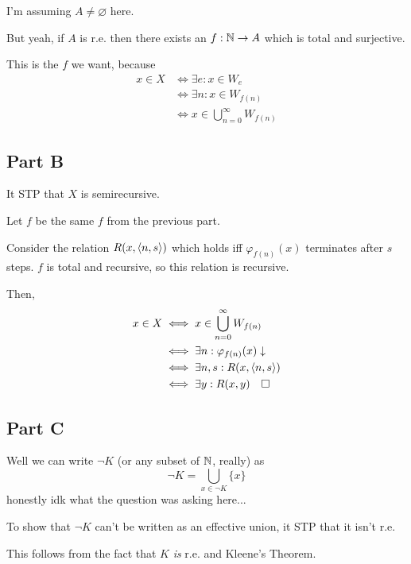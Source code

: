 \documentclass[12pt]{article}
\begin{document}
I'm assuming $A \ne \varnothing$ here.

But yeah, if $A$ is r.e. then there exists an $f: \mathbb{N} \to A$ which is total and surjective.

This is the $f$ we want, because
\begin{align*}
  x \in X
   & \iff \exists e: x \in W_e          \\
   & \iff \exists n: x \in W_{f(n)}     \\
   & \iff x \in \bigcup_{n=0}^\infty W_{f(n)}
\end{align*}

\subsection{Part B}

It STP that $X$ is semirecursive.

Let $f$ be the same $f$ from the previous part.

Consider the relation $R(x, \braket{n, s})$ which holds iff $\varphi_{f(n)}(x)$ terminates after $s$ steps.
$f$ is total and recursive, so this relation is recursive.

Then,
\begin{align*}
  x \in X
  &\iff x \in \bigcup_{n=0}^\infty W_{f(n)} \\
  &\iff \exists n: \varphi_{f(n)}(x)\downarrow \\
  &\iff \exists n, s: R(x, \braket{n, s}) \\
  &\iff \exists y: R(x, y)\quad\square
\end{align*}

\subsection{Part C}

Well we can write $\lnot K$ (or any subset of $\mathbb{N}$, really) as
\[\lnot K = \bigcup_{x \in \lnot K} \{x\}\]
{\scriptsize honestly idk what the question was asking here...}

To show that $\lnot K$ can't be written as an effective union, it STP that it isn't r.e.

This follows from the fact that $K$ \textit{is} r.e. and Kleene's Theorem.
\end{document}
